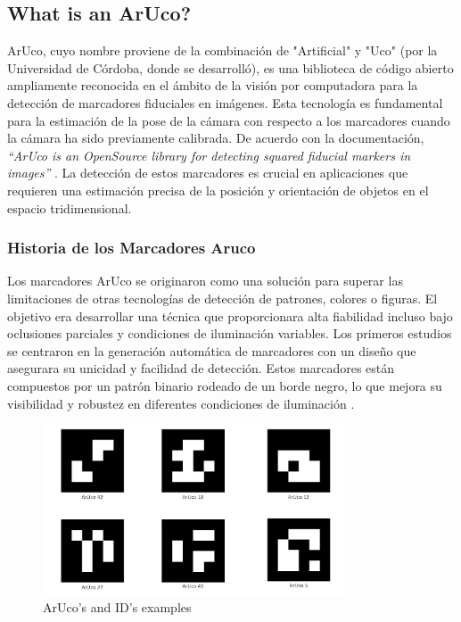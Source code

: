 \subsection{What is an ArUco?}
    ArUco, cuyo nombre proviene de la combinación de "Artificial" y "Uco" (por la Universidad de Córdoba, donde se desarrolló), es una biblioteca de código abierto ampliamente reconocida en el ámbito de la visión por computadora para la detección de marcadores fiduciales en imágenes. Esta tecnología es fundamental para la estimación de la pose de la cámara con respecto a los marcadores cuando la cámara ha sido previamente calibrada. De acuerdo con la documentación, \textit{“ArUco is an OpenSource library for detecting squared fiducial markers in images”} \cite{aruco_docs}. La detección de estos marcadores es crucial en aplicaciones que requieren una estimación precisa de la posición y orientación de objetos en el espacio tridimensional.

    \subsubsection{Historia de los Marcadores Aruco}

    Los marcadores ArUco se originaron como una solución para superar las limitaciones de otras tecnologías de detección de patrones, colores o figuras. El objetivo era desarrollar una técnica que proporcionara alta fiabilidad incluso bajo oclusiones parciales y condiciones de iluminación variables. Los primeros estudios se centraron en la generación automática de marcadores con un diseño que asegurara su unicidad y facilidad de detección. Estos marcadores están compuestos por un patrón binario rodeado de un borde negro, lo que mejora su visibilidad y robustez en diferentes condiciones de iluminación \cite{aruco_docs}.

    \begin{figure}[h!] 
        \centering 
        \includegraphics[width=0.8\textwidth]{pictures/arucos_ids.png} %
        \caption{ArUco's and ID's examples} 
        \label{fig} 
    \end{figure}

